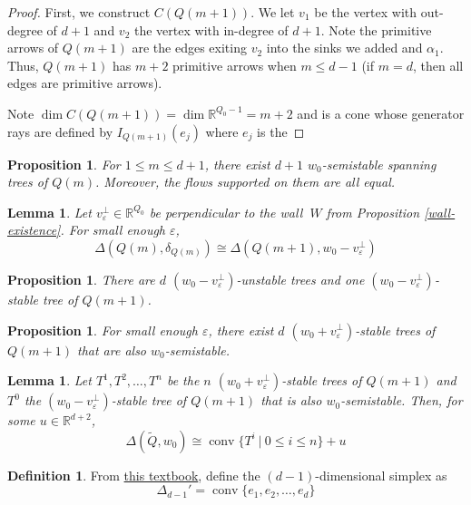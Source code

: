 \documentclass[11pt]{amsart}
\theoremstyle{plain}
\newtheorem{lemma}[theorem]{Lemma}
\newtheorem{proposition}[theorem]{Proposition}
\theoremstyle{definition}
\newtheorem{definition}[theorem]{Definition}
\newcommand{\R}{\mathbb{R}}
\DeclareMathOperator{\conv}{conv}
\begin{document}
\begin{proof}
    First, we construct $C(Q(m + 1))$. We let $v_1$ be the vertex with out-degree of $d + 1$ and $v_2$ the vertex with in-degree of $d + 1$. Note the primitive arrows of $Q(m + 1)$ are the edges exiting $v_2$ into the sinks we added and $\alpha_1$. Thus, $Q(m + 1)$ has $m + 2$ primitive arrows when $m \leq d - 1$ (if $m = d$, then all edges are primitive arrows).

    Note $\dim C(Q(m + 1)) = \dim \R^{Q_0 - 1} = m + 2$ and is a cone whose generator rays are defined by $I_{Q(m + 1)}(e_j)$ where $e_j$ is the 
\end{proof}

\begin{proposition}
    For $1 \leq m \leq d + 1$, there exist $d + 1$ $w_0$-semistable spanning trees of $Q(m)$. Moreover, the flows supported on them are all equal.
\end{proposition}

\begin{lemma}
   Let $v_\varepsilon^\perp \in \R^{Q_0}$ be perpendicular to the wall $\:W$ from Proposition \ref{wall-existence}. For small enough $\varepsilon$, 
    \[
    \Delta(Q(m), \delta_{Q(m)}) \cong \Delta(Q(m+1), w_0 - v_\varepsilon^\perp)
    \]
\end{lemma}

\begin{proposition}
    There are $d$ $(w_0-v_\varepsilon^\perp)$-unstable trees and one $(w_0-v_\varepsilon^\perp)$-stable tree of $Q(m + 1)$.
\end{proposition}

\begin{proposition}
    For small enough $\varepsilon$, there exist $d$ $(w_0 + v_\varepsilon^\perp)$-stable trees of $Q(m+1)$ that are also $w_0$-semistable.
\end{proposition}

\begin{lemma}
    Let $T^1, T^2, \ldots, T^n$ be the $n$ $(w_0 + v_\varepsilon^\perp)$-stable trees of $Q(m+1)$ and $T^0$ the $(w_0 - v_\varepsilon^\perp)$-stable tree of $Q(m+1)$  that is also $w_0$-semistable. Then, for some $u \in \R^{d+2}$,
    \[
        \Delta(\widetilde{Q}, w_0) \cong \conv\{T^i \:|\: 0 \leq i \leq n\} + u
    \]
\end{lemma}

\begin{definition}
    From \hyperlink{https://www.csun.edu/~ctoth/Handbook/chap15.pdf}{this textbook}, define the $(d-1)$-dimensional simplex as
    \[
        \Delta_{d-1}' = \conv\{e_1, e_2, \ldots, e_d\}
    \]
\end{definition}
\end{document}
